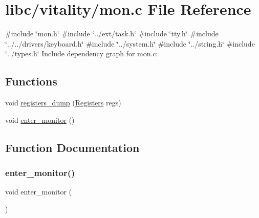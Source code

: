 \hypertarget{a00173}{}\section{libc/vitality/mon.c File Reference}
\label{a00173}
{\ttfamily \#include \char`\"{}mon.\+h\char`\"{}}\newline
{\ttfamily \#include \char`\"{}../ext/task.\+h\char`\"{}}\newline
{\ttfamily \#include \char`\"{}tty.\+h\char`\"{}}\newline
{\ttfamily \#include \char`\"{}../../drivers/keyboard.\+h\char`\"{}}\newline
{\ttfamily \#include \char`\"{}../system.\+h\char`\"{}}\newline
{\ttfamily \#include \char`\"{}../string.\+h\char`\"{}}\newline
{\ttfamily \#include \char`\"{}../types.\+h\char`\"{}}\newline
Include dependency graph for mon.\+c\+:
\subsection*{Functions}
\begin{DoxyCompactItemize}
\item 
void \hyperlink{a00173_ac4a1734d665cf10e32ddb9ebebfd8169_ac4a1734d665cf10e32ddb9ebebfd8169}{registers\+\_\+dump} (\hyperlink{a00260}{Registers} regs)
\item 
void \hyperlink{a00173_a33b77c779213ba5f7a0381c995a06f62_a33b77c779213ba5f7a0381c995a06f62}{enter\+\_\+monitor} ()
\end{DoxyCompactItemize}


\subsection{Function Documentation}
\mbox{\label{a00173_a33b77c779213ba5f7a0381c995a06f62_a33b77c779213ba5f7a0381c995a06f62}} 
\subsubsection{\texorpdfstring{enter\+\_\+monitor()}{enter\_monitor()}}
{\footnotesize\ttfamily void enter\+\_\+monitor (\begin{DoxyParamCaption}{ }\end{DoxyParamCaption})}



